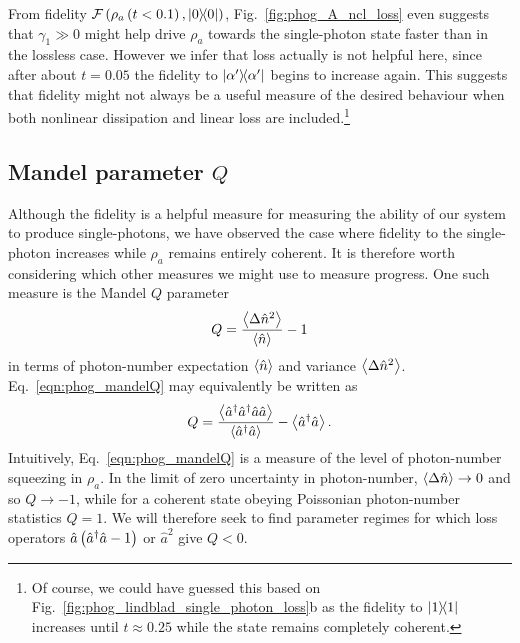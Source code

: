 From fidelity $\mathcal{F}\left( \rho_a\left(t<0.1\right), \dyad{0}\right)$, Fig.~\ref{fig:phog_A_ncl_loss} even suggests that $\gamma_1 \gg 0$ might help drive $\rho_a$ towards the single-photon state faster than in the lossless case. However we infer that loss actually is not helpful here, since after about $t=0.05$ the fidelity to $\dyad{\alpha^\prime}$ begins to increase again. This suggests that fidelity might not always be a useful measure of the desired behaviour when both nonlinear dissipation and linear loss are included.\footnote{Of course, we could have guessed this based on Fig.~\ref{fig:phog_lindblad_single_photon_loss}b as the fidelity to $\dyad{1}$ increases until $t\approx 0.25$ while the state remains completely coherent.}




\subsection{Mandel parameter $Q$}
Although the fidelity is a helpful measure for measuring the ability of our system to produce single-photons, we have observed the case where fidelity to the single-photon increases while $\rho_a$ remains entirely coherent. It is therefore worth considering which other measures we might use to measure progress. One such measure is the Mandel $Q$ parameter 
\begin{equation}\label{eqn:phog_mandelQ}
Q = \frac{\ev{\Delta\hat{n}^2}}{\ev{\hat{n}}} - 1
\end{equation}
in terms of photon-number expectation $\ev{\hat{n}}$ and variance $\ev{\Delta\hat{n}^2}$. Eq.~\ref{eqn:phog_mandelQ} may equivalently be written as 
\begin{equation}
Q = \frac{\ev{\hat{a}^\dagger \hat{a}^\dagger \hat{a}\hat{a}}}{\ev{\hat{a}^\dagger \hat{a}}} - \ev{\hat{a}^\dagger \hat{a}}.
\end{equation}
Intuitively, Eq.~\ref{eqn:phog_mandelQ} is a measure of the level of photon-number squeezing in $\rho_a$. In the limit of zero uncertainty in photon-number, $\ev{\Delta\hat{n}} \rightarrow 0$ and so $Q \rightarrow -1$, while for a coherent state obeying Poissonian photon-number statistics $Q = 1$. We will therefore seek to find parameter regimes for which loss operators $\hat{a}\left(\hat{a}^\dagger \hat{a} - 1\right)$ or $\hat{a}^2$ give $Q<0$. 


